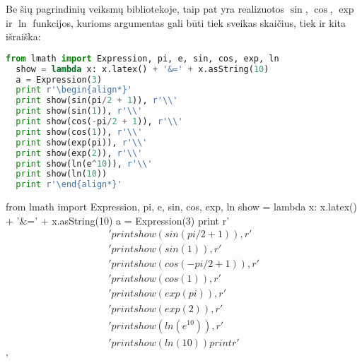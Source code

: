 Be šių pagrindinių veiksmų bibliotekoje, taip pat yra realizuotos
$\sin$, $\cos$, $\exp$ ir $\ln$ funkcijos, kurioms argumentas gali
būti tiek sveikas skaičius, tiek ir kita išraiška:

\begin{lstlisting}[language=python]
  from lmath import Expression, pi, e, sin, cos, exp, ln
  show = lambda x: x.latex() + '&=' + x.asString(10)
  a = Expression(3)
  print r'\begin{align*}'
  print show(sin(pi/2 + 1)), r'\\'
  print show(sin(1)), r'\\'
  print show(cos(-pi/2 + 1)), r'\\'
  print show(cos(1)), r'\\'
  print show(exp(pi)), r'\\'
  print show(exp(2)), r'\\'
  print show(ln(e^10)), r'\\'
  print show(ln(10))
  print r'\end{align*}'
\end{lstlisting}
\begin{python}%
from lmath import Expression, pi, e, sin, cos, exp, ln
show = lambda x: x.latex() + '&=' + x.asString(10)
a = Expression(3)
print r'\begin{align*}'
print show(sin(pi/2 + 1)), r'\\'
print show(sin(1)), r'\\'
print show(cos(-pi/2 + 1)), r'\\'
print show(cos(1)), r'\\'
print show(exp(pi)), r'\\'
print show(exp(2)), r'\\'
print show(ln(e^10)), r'\\'
print show(ln(10))
print r'\end{align*}'
\end{python}



